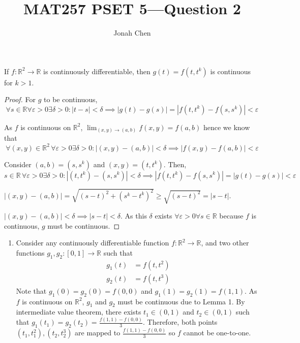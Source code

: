 \documentclass{exam}
\title{MAT257 PSET 5---Question 2}
\author{Jonah Chen}
\numberwithin{equation}{section}
\newcommand{\R}{\mathbb{R}}
\begin{document}
    \sffamily
    \maketitle
    \begin{lemma}
        If $f:\R^2\to\R$ is continuously differentiable, then $g(t)=f(t,t^k)$ is continuous for $k>1$. 

        \begin{proof}
            For $g$ to be continuous, $$\forall s\in\R\forall\varepsilon>0\exists\delta>0:|t-s|<\delta\implies|g(t)-g(s)|=|f(t,t^k)-f(s,s^k)|<\varepsilon$$

            As $f$ is continuous on $\R^2$, $\lim_{(x,y)\to(a,b)}f(x,y)=f(a,b)$ hence we know that $$\forall(x,y)\in\R^2\,\forall\varepsilon>0\exists\delta>0:|(x,y)-(a,b)|<\delta\implies|f(x,y)-f(a,b)|<\varepsilon$$

            Consider $(a,b)=(s,s^k)$ and $(x,y)=(t,t^k)$. Then,$$s\in\R\,\forall\varepsilon>0\exists\delta>0:|(t,t^k)-(s,s^k)|<\delta\implies|f(t,t^k)-f(s,s^k)|=|g(t)-g(s)|<\varepsilon$$

            
            $|(x,y)-(a,b)|=\sqrt{(s-t)^2+(s^k-t^k)^2}\geq\sqrt{(s-t)^2}=|s-t|$. 
            
            $|(x,y)-(a,b)|<\delta\implies|s-t|<\delta$. As this $\delta$ exists $\forall\varepsilon>0\forall s\in\R$ because $f$ is continuous, $g$ must be continuous.
        \end{proof}
    \end{lemma} 
    \begin{enumerate}[label=(\alph*)]
        \item 
        Consider any continuously differentiable function $f:\R^2\to\R$, and two other functions $g_1, g_2:[0,1]\to\R$ such that 
        \begin{align*}
            g_1(t)&=f(t,t^2)\\
            g_2(t)&=f(t,t^3)
        \end{align*}
        Note that $g_1(0)=g_2(0)=f(0,0)$ and $g_1(1)=g_2(1)=f(1,1)$. As $f$ is continuous on $\R^2$, $g_1$ and $g_2$ must be continuous due to Lemma 1. By intermediate value theorem, there exists $t_1\in(0,1)$ and $t_2\in(0,1)$ such that $g_1(t_1)=g_2(t_2)=\frac{f(1,1)-f(0,0)}{3}$. Therefore, both points $(t_1,t_1^2), (t_2,t_2^3)$ are mapped to $\frac{f(1,1)-f(0,0)}{3}$ so $f$ cannot be one-to-one.
    \end{enumerate}
\end{document}
